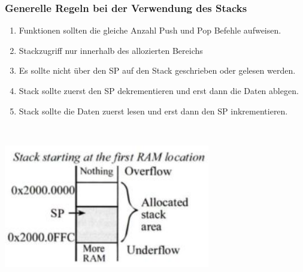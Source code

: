 \subsubsection{Generelle Regeln bei der Verwendung des Stacks}
\begin{minipage}{9cm}
	\begin{enumerate}
        \item Funktionen sollten die gleiche Anzahl Push und Pop Befehle aufweisen.
        \item Stackzugriff nur innerhalb des allozierten Bereichs
        \item Es sollte nicht über den SP auf den Stack geschrieben oder gelesen werden.
        \item Stack sollte zuerst den SP dekrementieren und erst dann die Daten ablegen.
        \item Stack sollte die Daten zuerst lesen und erst dann den SP inkrementieren.
    \end{enumerate}
\end{minipage}
%
\begin{minipage}{0.5cm}
	\-\
\end{minipage}
%
\begin{minipage}{9cm}
	 \includegraphics[width=9cm]{images/allocatedStack}  
\end{minipage}

